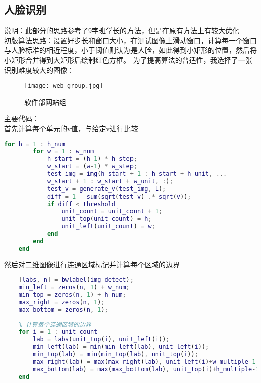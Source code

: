 \documentclass[12pt]{article}
\begin{document}
\subsection{人脸识别}
说明：此部分的思路参考了9字班学长的\href{https://github.com/Timothy-Liuxf/THUEE_MATLAB/tree/master/image}{方法}，但是在原有方法上有较大优化\\
\hspace*{2em}初版算法思路：设置好步长和窗口大小，在测试图像上滑动窗口，计算每一个窗口与人脸标准的相近程度，小于阈值则认为是人脸，如此得到小矩形的位置，然后将小矩形合并得到大矩形后绘制红色方框。
为了提高算法的普适性，我选择了一张识别难度较大的图像：

\begin{figure}[H]
    \centering
    \texttt{[image: web\_group.jpg]}
    \caption{软件部网站组}
\end{figure}

主要代码：\\
\hspace*{2em}首先计算每个单元的v值，与给定v进行比较
\begin{lstlisting}[language=matlab]
    for h = 1 : h_num
        for w = 1 : w_num
            h_start = (h-1) * h_step;
            w_start = (w-1) * w_step;
            test_img = img(h_start + 1 : h_start + h_unit, ... 
            w_start + 1 : w_start + w_unit, :);
            test_v = generate_v(test_img, L);
            diff = 1 - sum(sqrt(test_v) .* sqrt(v));
            if diff < threshold
                unit_count = unit_count + 1;
                unit_top(unit_count) = h;
                unit_left(unit_count) = w;
            end
        end
    end
\end{lstlisting}

然后对二维图像进行连通区域标记并计算每个区域的边界

\begin{lstlisting}[language=matlab]
    % 对二值图像进行连通区域标记
    [labs, n] = bwlabel(img_detect);
    min_left = zeros(n, 1) + w_num;
    min_top = zeros(n, 1) + h_num;
    max_right = zeros(n, 1);
    max_bottom = zeros(n, 1);
    
    % 计算每个连通区域的边界
    for i = 1 : unit_count
        lab = labs(unit_top(i), unit_left(i));
        min_left(lab) = min(min_left(lab), unit_left(i));
        min_top(lab) = min(min_top(lab), unit_top(i));
        max_right(lab) = max(max_right(lab), unit_left(i)+w_multiple-1);
        max_bottom(lab) = max(max_bottom(lab), unit_top(i)+h_multiple-1);
    end
\end{lstlisting}
\end{document}
